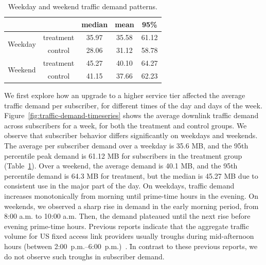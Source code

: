 \begin{table}[t]
\centering
\begin{tabular}{ c c | c c c }\\\hline
                         &           & median & mean  & 95\%  \\\hline
\multirow{2}{*}{Weekday} & treatment & 35.97  & 35.58 & 61.12 \\
                         & control   & 28.06  & 31.12 & 58.78 \\\hline
\multirow{2}{*}{Weekend} & treatment & 45.27  & 40.10 & 64.27 \\
                         & control   & 41.15  & 37.66 & 62.23 \\\hline
\end{tabular}
\caption{Weekday and weekend traffic demand patterns.}
\label{tab:traffic-demand-description}
\end{table}

We first explore how an upgrade to a higher service tier affected the
average traffic demand per subscriber, for different times of the day
and days of the week.  Figure~\ref{fig:traffic-demand-timeseries} shows
the average downlink traffic demand across subscribers for a week, for
both the treatment and control groups. We observe that subscriber
behavior differs significantly on weekdays and weekends.  The average
per subscriber demand over a weekday is 35.6 MB, and the 95th percentile
peak demand is 61.12 MB for subscribers in the treatment group
(Table~\ref{tab:traffic-demand-description}).  Over a weekend, the
average demand is 40.1 MB, and the 95th percentile demand is 64.3 MB for
treatment, but the median is 45.27 MB due to consistent use in the major
part of the day.  On weekdays, traffic demand increases monotonically
from morning until prime-time hours in the evening. On weekends, we
observed a sharp rise in demand in the early morning period, from 8:00
a.m. to 10:00 a.m. Then, the demand plateaued until the next rise
before evening prime-time hours. Previous reports indicate that
the aggregate traffic volume for US fixed access link providers usually
troughs during mid-afternoon hours (between
2:00~p.m.--6:00~p.m.)~\cite{sandvine20141h}. \f{In contrast to these
  previous reports, we do not observe such troughs in 
subscriber demand.}


